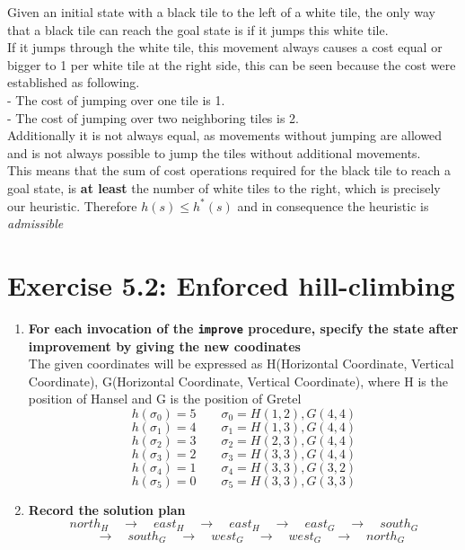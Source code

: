 \documentclass[12pt,a4paper]{article}
\begin{document}
	\begin{addmargin}[1em]{1em}%
		\quad Given an initial state with a black tile to the left of a white
		tile, the only way that a black tile can reach the goal state is if
		it jumps this white tile. \\
		If it jumps through the white tile, this movement always causes a cost equal or bigger to 1 per white tile at the right side, this can be seen because the cost were established as following.\\
		- The cost of jumping over one tile is 1.\\
		- The cost of jumping over two neighboring tiles is 2. \\
		Additionally it is not always equal, as movements without jumping are allowed and is not always possible to jump the tiles without additional movements.\\
		This means that the sum of cost operations required for the black tile to reach a goal state,
		is \textbf{at least} the number of white tiles to the right, which is 
		precisely our heuristic. Therefore $h(s) \leq h^*(s) $
		and in consequence the heuristic is \emph{admissible}
	\end{addmargin}

\section*{Exercise 5.2: Enforced hill-climbing}
\begin{enumerate}[label=\alph*)]
	\item \textbf{For each invocation of the 
			\texttt{improve} procedure, specify
			the state after improvement by giving the new coodinates}\\
	The given coordinates will be expressed as H(Horizontal Coordinate, Vertical Coordinate), G(Horizontal Coordinate, Vertical Coordinate), where H is the position of Hansel and G is the position of Gretel\\
	\[h(\sigma_0) = 5 \qquad \sigma_0 = H(1,2), G(4,4) \]
	\[h(\sigma_1) = 4 \qquad \sigma_1 = H(1,3), G(4,4) \]
	\[h(\sigma_2) = 3 \qquad \sigma_2 = H(2,3), G(4,4) \]	\[h(\sigma_3) = 2 \qquad \sigma_3 = H(3,3), G(4,4) \]	\[h(\sigma_4) = 1 \qquad \sigma_4 = H(3,3), G(3,2) \]	\[h(\sigma_5) = 0 \qquad \sigma_5 = H(3,3), G(3,3) \]	
	\item \textbf{Record the solution plan}
	\[north_H \quad \rightarrow \quad east_H \quad \rightarrow \quad east_H \quad \rightarrow \quad east_G
	\quad \rightarrow \quad south_G \]
	\[\quad \rightarrow \quad south_G \quad \rightarrow \quad west_G \quad \rightarrow \quad west_G \quad \rightarrow \quad north_G\]
\end{enumerate}
\end{document}
